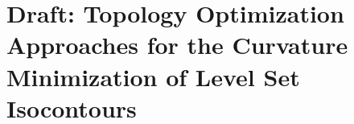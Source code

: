 \chapter{Draft: Topology Optimization Approaches for the Curvature Minimization of Level Set Isocontours}
\label{sec:topology_optimization_approaches_for_the_curvature_minimization_of_level_set_isocontours}






% 








